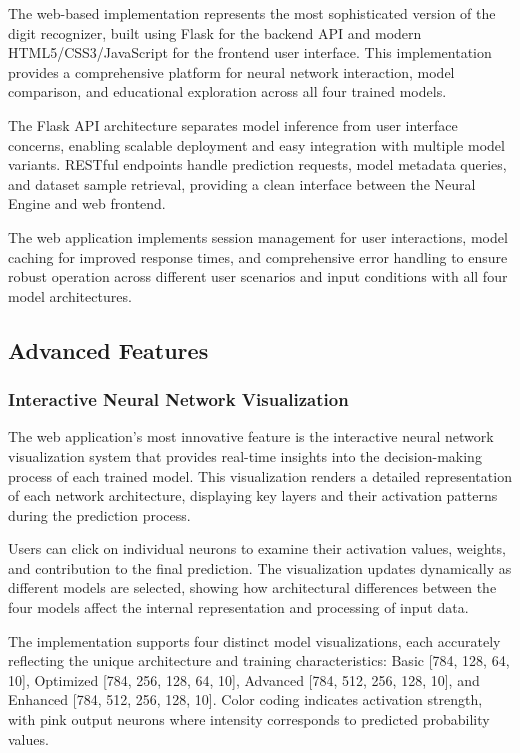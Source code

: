 \documentclass[11pt,a4paper]{report}
\begin{document}
The web-based implementation represents the most sophisticated version of the digit recognizer, built using Flask for the backend API and modern HTML5/CSS3/JavaScript for the frontend user interface. This implementation provides a comprehensive platform for neural network interaction, model comparison, and educational exploration across all four trained models.

The Flask API architecture separates model inference from user interface concerns, enabling scalable deployment and easy integration with multiple model variants. RESTful endpoints handle prediction requests, model metadata queries, and dataset sample retrieval, providing a clean interface between the Neural Engine and web frontend.

The web application implements session management for user interactions, model caching for improved response times, and comprehensive error handling to ensure robust operation across different user scenarios and input conditions with all four model architectures.

\subsection{Advanced Features}

\subsubsection{Interactive Neural Network Visualization}

The web application's most innovative feature is the interactive neural network visualization system that provides real-time insights into the decision-making process of each trained model. This visualization renders a detailed representation of each network architecture, displaying key layers and their activation patterns during the prediction process.

Users can click on individual neurons to examine their activation values, weights, and contribution to the final prediction. The visualization updates dynamically as different models are selected, showing how architectural differences between the four models affect the internal representation and processing of input data.

The implementation supports four distinct model visualizations, each accurately reflecting the unique architecture and training characteristics: Basic [784, 128, 64, 10], Optimized [784, 256, 128, 64, 10], Advanced [784, 512, 256, 128, 10], and Enhanced [784, 512, 256, 128, 10]. Color coding indicates activation strength, with pink output neurons where intensity corresponds to predicted probability values.
\end{document}
